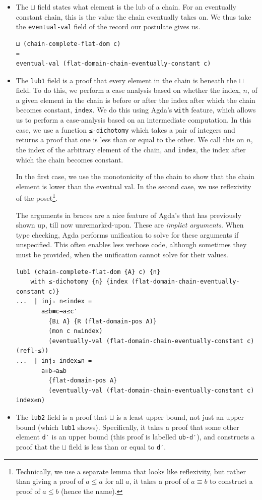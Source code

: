 \documentclass[12pt,a4paper,twoside,openright]{report}
\begin{document}
\begin{itemize}
\item The $\sqcup$ field states what element is the lub of a chain. For an eventually constant chain, this is the value the chain eventually takes on. We thus take the \texttt{eventual-val} field of the record our postulate gives us. 
\begin{verbatim}
⊔ (chain-complete-flat-dom c) 
= 
eventual-val (flat-domain-chain-eventually-constant c)
\end{verbatim}
\item The \texttt{lub1} field is a proof that every element in the chain is beneath the $\sqcup$ field. To do this, we perform a case analysis based on whether the index, $n$, of a given element in the chain is before or after the index after which the chain becomes constant, \texttt{index}. We do this using Agda's \texttt{with} feature, which allows us to perform a case-analysis based on an intermediate computation. In this case, we use a function \texttt{≤-dichotomy} which takes a pair of integers and returns a proof that one is less than or equal to the other. We call this on $n$, the index of the arbitrary element of the chain, and \texttt{index}, the index after which the chain becomes constant. 

In the first case, we use the monotonicity of the chain to show that the chain element is lower than the eventual val. In the second case, we use reflexivity of the poset\footnote{Technically, we use a separate lemma that looks like reflexivity, but rather than giving a proof of $a \leq a$ for all $a$, it takes a proof of $a \equiv b$ to construct a proof of $a \leq b$ (hence the name).}.

The arguments in braces are a nice feature of Agda's that has previously shown up, till now unremarked-upon. These are \textit{implict arguments}. When type checking, Agda performs unification to solve for these arguments if unspecified. This often enables less verbose code, although sometimes they must be provided, when the unification cannot solve for their values. 
\begin{verbatim}
lub1 (chain-complete-flat-dom {A} c) {n} 
    with ≤-dichotomy {n} {index (flat-domain-chain-eventually-constant c)}
...  | inj₁ n≤index = 
       a≤b≡c→a≤c′
         {B⊥ A} {R (flat-domain-pos A)}
         (mon c n≤index)
         (eventually-val (flat-domain-chain-eventually-constant c) (refl-≤))
...  | inj₂ index≤n = 
       a≡b→a≤b
         {flat-domain-pos A}
         (eventually-val (flat-domain-chain-eventually-constant c) index≤n)
\end{verbatim}
\item
The \texttt{lub2} field is a proof that $\sqcup$ is a least upper bound, not just an upper bound (which \texttt{lub1} shows). Specifically, it takes a proof that some other element \texttt{d′} is an upper bound (this proof is labelled \texttt{ub-d′}), and constructs a proof that the $\sqcup$ field is less than or equal to \texttt{d′}.


\end{itemize}
\end{document}
